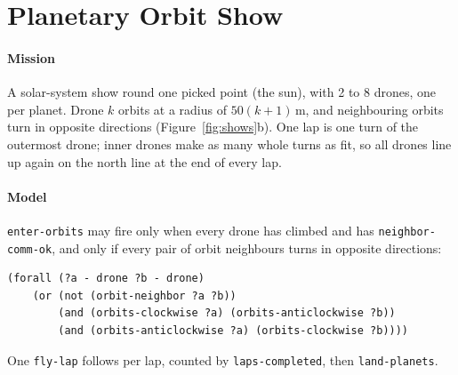 \documentclass[11pt,a4paper,oneside]{report}
\newcommand{\code}[1]{\texttt{#1}}
\begin{document}
\section{Planetary Orbit Show}
\paragraph{Mission}
A solar-system show round one picked point (the sun), with 2 to 8 drones, one per planet. Drone
$k$ orbits at a radius of $50(k+1)$\,m, and neighbouring orbits turn in opposite directions
(Figure~\ref{fig:shows}b). One lap is one turn of the outermost drone; inner drones make as many
whole turns as fit, so all drones line up again on the north line at the end of every lap.

\paragraph{Model}
\code{enter-orbits} may fire only when every drone has climbed and has \code{neighbor-comm-ok},
and only if every pair of orbit neighbours turns in opposite directions:

\begin{lstlisting}
(forall (?a - drone ?b - drone)
    (or (not (orbit-neighbor ?a ?b))
        (and (orbits-clockwise ?a) (orbits-anticlockwise ?b))
        (and (orbits-anticlockwise ?a) (orbits-clockwise ?b))))
\end{lstlisting}

\noindent One \code{fly-lap} follows per lap, counted by \code{laps-completed}, then
\code{land-planets}.
\end{document}
